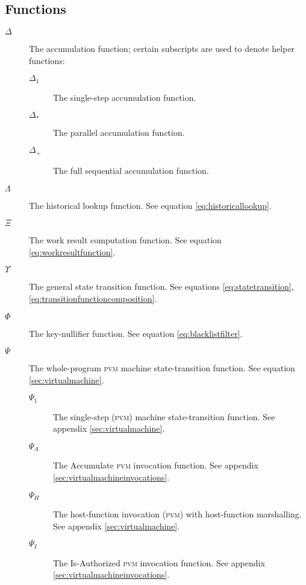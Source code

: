 \subsection{Functions}

\begin{description}
  \item[$\Delta$] The accumulation function; certain subscripts are used to denote helper functions: %
  \begin{description}
    \item[$\Delta_1$] The single-step accumulation function.
    \item[$\Delta_*$] The parallel accumulation function.
    \item[$\Delta_+$] The full sequential accumulation function.
  \end{description}
  \item[$\Lambda$] The historical lookup function. See equation \ref{eq:historicallookup}. %
  \item[$\Xi$] The work result computation function. See equation \ref{eq:workresultfunction}. %
  \item[$\Upsilon$] The general state transition function. See equations \ref{eq:statetransition}, \ref{eq:transitionfunctioncomposition}. %
  \item[$\Phi$] The key-nullifier function. See equation \ref{eq:blacklistfilter}. %
  \item[$\Psi$] The whole-program \textsc{pvm} machine state-transition function. See equation \ref{sec:virtualmachine}. %
  \begin{description}
    \item[$\Psi_1$] The single-step (\textsc{pvm}) machine state-transition function. See appendix \ref{sec:virtualmachine}. %
    \item[$\Psi_A$] The Accumulate \textsc{pvm} invocation function. See appendix \ref{sec:virtualmachineinvocations}.
    \item[$\Psi_H$] The host-function invocation (\textsc{pvm}) with host-function marshalling. See appendix \ref{sec:virtualmachine}. %
    \item[$\Psi_I$] The Is-Authorized \textsc{pvm} invocation function. See appendix \ref{sec:virtualmachineinvocations}.

\end{description}
\end{description}
